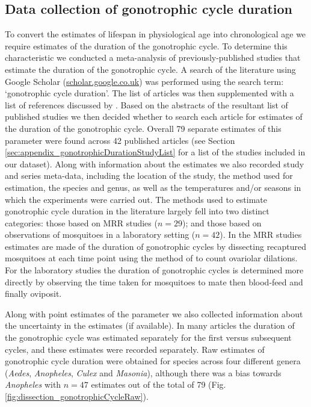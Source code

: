 \documentclass[12pt]{article}
\begin{document}
{\subsection{Data collection of gonotrophic cycle duration}\label{sec:dissection_gonotrophicData}
To convert the estimates of lifespan in physiological age into chronological age we require estimates of the duration of the gonotrophic cycle. To determine this characteristic we conducted a meta-analysis of previously-published studies that estimate the duration of the gonotrophic cycle. A search of the literature using Google Scholar (\url{scholar.google.co.uk}) was performed using the search term: `gonotrophic cycle duration'. The list of articles was then supplemented with a list of references discussed by \cite{silver2007mosquito}. Based on the abstracts of the resultant list of published studies we then decided whether to search each article for estimates of the duration of the gonotrophic cycle. Overall 79 separate estimates of this parameter were found across 42 published articles (see Section \ref{sec:appendix_gonotrophicDurationStudyList} for a list of the studies included in our dataset). Along with information about the estimates we also recorded study and series meta-data, including the location of the study, the method used for estimation, the species and genus, as well as the temperatures and/or seasons in which the experiments were carried out. The methods used to estimate gonotrophic cycle duration in the literature largely fell into two distinct categories: those based on MRR studies ($n=29$); and those based on observations of mosquitoes in a laboratory setting ($n=42$). In the MRR studies estimates are made of the duration of gonotrophic cycles by dissecting recaptured mosquitoes at each time point using the method of \cite{polovodova1949determination} to count ovariolar dilations. For the laboratory studies the duration of gonotrophic cycles is determined more directly by observing the time taken for mosquitoes to mate then blood-feed and finally oviposit.

Along with point estimates of the parameter we also collected information about the uncertainty in the estimates (if available). In many articles the duration of the gonotrophic cycle was estimated separately for the first versus subsequent cycles, and these estimates were recorded separately. Raw estimates of gonotrophic cycle duration were obtained for species across four different genera (\textit{Aedes}, \textit{Anopheles}, \textit{Culex} and \textit{Masonia}), although there was a bias towards \textit{Anopheles} with $n=47$ estimates out of the total of 79 (Fig. \ref{fig:dissection_gonotrophicCycleRaw}). 

}
\end{document}
